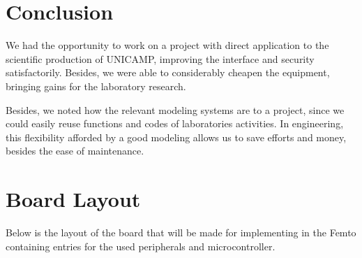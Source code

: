 \documentclass[journal]{IEEEtran}
\begin{document}
\section{Conclusion}


We had the opportunity to work on a project with direct application to the scientific production of UNICAMP, improving the interface and security satisfactorily. Besides, we were able to considerably cheapen the equipment, bringing gains for the laboratory research.


Besides, we noted how the relevant modeling systems are to a project, since we could easily reuse functions and codes of laboratories activities. In engineering, this flexibility afforded by a good modeling allows us to save efforts and money, besides the ease of maintenance.


\appendices
\section{Board Layout}


Below is the layout of the board that will be made for implementing in the Femto containing entries for the used peripherals and microcontroller.
\end{document}
